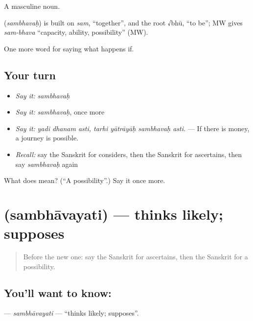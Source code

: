 A masculine noun.

\begin{cousinweb}
\textbf{} (\emph{sambhavaḥ}) is built on \emph{sam}, \textquotedblleft{}together\textquotedblright{}, and the root √bhū, \textquotedblleft{}to be\textquotedblright{}; MW gives \emph{sam-bhava} \textquotedblleft{}capacity, ability, possibility\textquotedblright{} (MW).
\end{cousinweb}

\begin{grammarlens}[title={What you've built}]
One more word for saying what happens if.
\end{grammarlens}

\subsection*{Your turn}
\begin{itemize}
\raggedright
  \item \emph{Say it:} \emph{sambhavaḥ}
  \item \emph{Say it:} \emph{sambhavaḥ}, once more
  \item \emph{Say it:} \emph{yadi dhanam asti, tarhi yātrāyāḥ sambhavaḥ asti.} — If there is money, a journey is possible.
  \item \emph{Recall:} say the Sanskrit for considers, then the Sanskrit for ascertains, then say \emph{sambhavaḥ} again
\end{itemize}

\begin{tcolorbox}[breakable,colback=teal!4,colframe=teal!35!black,title={Before you move on}]
What does  mean? (\textquotedblleft{}A possibility\textquotedblright{}.) Say it once more.
\end{tcolorbox}
\section[\texorpdfstring{\sk{सम्भावयति} (sambhāvayati)}{सम्भावयति (sambhāvayati)}]{ (sambhāvayati) — thinks likely; supposes}

\label{lesson:SA-C367-sambhavayati}



\begin{quote}
Before the new one: say the Sanskrit for ascertains, then the Sanskrit for a possibility.
\end{quote}

\subsection*{You'll want to know: }
\textbf{} — \emph{sambhāvayati} — \textquotedblleft{}thinks likely; supposes\textquotedblright{}.

